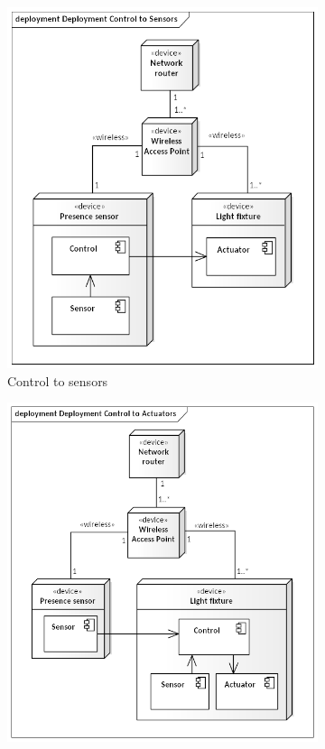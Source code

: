 \documentclass[11pt, english, a4paper, twoside]{article}
\begin{document}
\begin{figure}[h]
\begin{subfigure}[b]{0.45\textwidth}
		\includegraphics[width=\textwidth]{Deployment Control to Sensors.png}
		\caption{Control to sensors}
		\label{fig:deploy-sensor-controller}
	\end{subfigure}
    \hfill
    \begin{subfigure}[b]{0.45\textwidth}
		\centering
		\includegraphics[width=\textwidth]{Deployment Control to Actuators.png}

\end{subfigure}
\end{figure}
\end{document}
